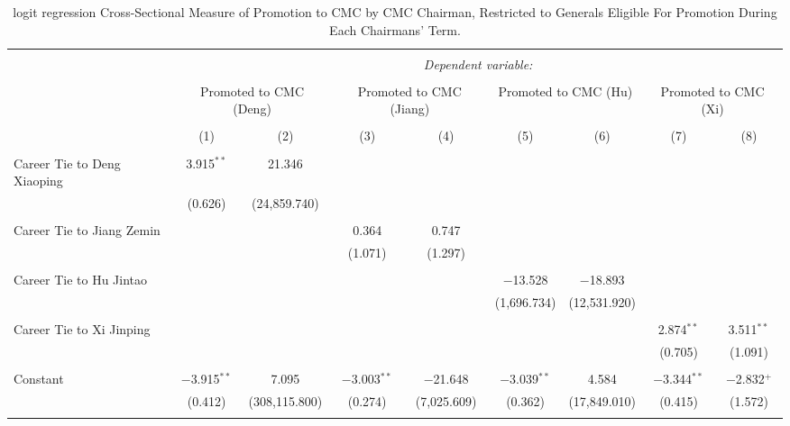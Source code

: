 
\begin{table}[!htbp] \centering 
  \caption{logit regression Cross-Sectional Measure of Promotion to CMC by CMC Chairman, Restricted to Generals Eligible For Promotion During Each Chairmans' Term.} 
  \label{table_a19} 
\begin{tabular}{@{\extracolsep{5pt}}lcccccccc} 
\\[-1.8ex]\hline 
\hline \\[-1.8ex] 
 & \multicolumn{8}{c}{\textit{Dependent variable:}} \\ 
\cline{2-9} 
\\[-1.8ex] & \multicolumn{2}{c}{Promoted to CMC (Deng)} & \multicolumn{2}{c}{Promoted to CMC (Jiang)} & \multicolumn{2}{c}{Promoted to CMC (Hu)} & \multicolumn{2}{c}{Promoted to CMC (Xi)} \\ 
\\[-1.8ex] & (1) & (2) & (3) & (4) & (5) & (6) & (7) & (8)\\ 
\hline \\[-1.8ex] 
 Career Tie to Deng Xiaoping & 3.915$^{**}$ & 21.346 &  &  &  &  &  &  \\ 
  & (0.626) & (24,859.740) &  &  &  &  &  &  \\ 
  & & & & & & & & \\ 
 Career Tie to Jiang Zemin &  &  & 0.364 & 0.747 &  &  &  &  \\ 
  &  &  & (1.071) & (1.297) &  &  &  &  \\ 
  & & & & & & & & \\ 
 Career Tie to Hu Jintao &  &  &  &  & $-$13.528 & $-$18.893 &  &  \\ 
  &  &  &  &  & (1,696.734) & (12,531.920) &  &  \\ 
  & & & & & & & & \\ 
 Career Tie to Xi Jinping &  &  &  &  &  &  & 2.874$^{**}$ & 3.511$^{**}$ \\ 
  &  &  &  &  &  &  & (0.705) & (1.091) \\ 
  & & & & & & & & \\ 
 Constant & $-$3.915$^{**}$ & 7.095 & $-$3.003$^{**}$ & $-$21.648 & $-$3.039$^{**}$ & 4.584 & $-$3.344$^{**}$ & $-$2.832$^{+}$ \\ 
  & (0.412) & (308,115.800) & (0.274) & (7,025.609) & (0.362) & (17,849.010) & (0.415) & (1.572) \\ 
  & & & & & & & & \\ 

\end{tabular}
\end{table}
